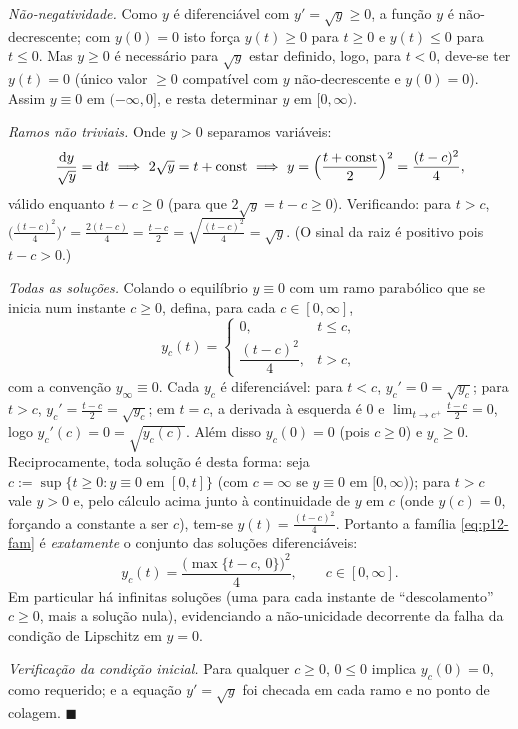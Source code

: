 \emph{Não-negatividade.} Como $y$ é diferenciável com $y'=\sqrt y\ge0$, a função $y$ é não-decrescente; com $y(0)=0$ isto força $y(t)\ge0$ para $t\ge0$ e $y(t)\le0$ para $t\le0$. Mas $y\ge0$ é necessário para $\sqrt y$ estar definido, logo, para $t<0$, deve-se ter $y(t)=0$ (único valor $\ge0$ compatível com $y$ não-decrescente e $y(0)=0$). Assim $y\equiv0$ em $(-\infty,0]$, e resta determinar $y$ em $[0,\infty)$.

\emph{Ramos não triviais.} Onde $y>0$ separamos variáveis:
\[
\frac{\d y}{\sqrt y}=\d t\ \Longrightarrow\ 2\sqrt y=t+\text{const}\ \Longrightarrow\ y=\Big(\frac{t+\text{const}}{2}\Big)^2=\frac{(t-c)^2}{4},
\]
válido enquanto $t-c\ge0$ (para que $2\sqrt y=t-c\ge0$). Verificando: para $t>c$, $\big(\tfrac{(t-c)^2}{4}\big)'=\tfrac{2(t-c)}{4}=\tfrac{t-c}{2}=\sqrt{\tfrac{(t-c)^2}{4}}=\sqrt y$. (O sinal da raiz é positivo pois $t-c>0$.)

\emph{Todas as soluções.} Colando o equilíbrio $y\equiv0$ com um ramo parabólico que se inicia num instante $c\ge0$, defina, para cada $c\in[0,\infty]$,
\begin{equation}\label{eq:p12-fam}
y_c(t)=\begin{cases}0, & t\le c,\\[4pt]\dfrac{(t-c)^2}{4}, & t> c,\end{cases}
\end{equation}
com a convenção $y_\infty\equiv0$. Cada $y_c$ é diferenciável: para $t<c$, $y_c'=0=\sqrt{y_c}$; para $t>c$, $y_c'=\tfrac{t-c}{2}=\sqrt{y_c}$; em $t=c$, a derivada à esquerda é $0$ e $\lim_{t\to c^+}\tfrac{t-c}{2}=0$, logo $y_c'(c)=0=\sqrt{y_c(c)}$. Além disso $y_c(0)=0$ (pois $c\ge0$) e $y_c\ge0$. Reciprocamente, toda solução é desta forma: seja $c:=\sup\{t\ge0:y\equiv0\text{ em }[0,t]\}$ (com $c=\infty$ se $y\equiv0$ em $[0,\infty)$); para $t>c$ vale $y>0$ e, pelo cálculo acima junto à continuidade de $y$ em $c$ (onde $y(c)=0$, forçando a constante a ser $c$), tem-se $y(t)=\tfrac{(t-c)^2}{4}$. Portanto a família \eqref{eq:p12-fam} é \emph{exatamente} o conjunto das soluções diferenciáveis:
\[
\boxed{\,y_c(t)=\dfrac{\big(\max\{t-c,\,0\}\big)^2}{4},\qquad c\in[0,\infty].\,}
\]
Em particular há infinitas soluções (uma para cada instante de ``descolamento'' $c\ge0$, mais a solução nula), evidenciando a não-unicidade decorrente da falha da condição de Lipschitz em $y=0$.

\emph{Verificação da condição inicial.} Para qualquer $c\ge0$, $0\le0$ implica $y_c(0)=0$, como requerido; e a equação $y'=\sqrt y$ foi checada em cada ramo e no ponto de colagem.
\qquad$\blacksquare$
